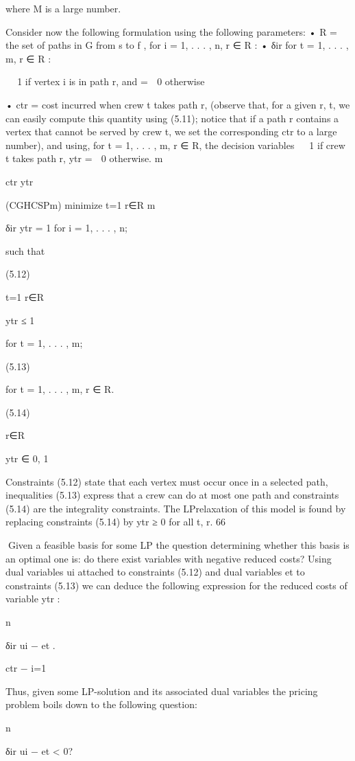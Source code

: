 \documentclass[titlepage]{book}
\theoremstyle{plain}
\theoremstyle{definition}
\theoremstyle{remark}
\begin{document}
where M is a large number.

Consider now the following formulation using the following parameters:
• R = the set of paths in G from s to f ,
for i = 1, . . . , n, r ∈ R :
• δir
for t = 1, . . . , m, r ∈ R :


 1 if vertex i is in path r, and
=
 0 otherwise

• ctr = cost incurred when crew t takes path r, (observe that, for a given r, t, we can easily compute
this quantity using (5.11); notice that if a path r contains a vertex that cannot be served by crew t, we
set the corresponding ctr to a large number),
and using, for t = 1, . . . , m, r ∈ R, the decision variables

 1 if crew t takes path r,
ytr =
 0 otherwise.
m

ctr ytr

(CGHCSPm) minimize
t=1 r∈R
m

δir ytr = 1 for i = 1, . . . , n;

such that

(5.12)

t=1 r∈R

ytr ≤ 1

for t = 1, . . . , m;

(5.13)

for t = 1, . . . , m, r ∈ R.

(5.14)

r∈R

ytr ∈ {0, 1}

Constraints (5.12) state that each vertex must occur once in a selected path, inequalities (5.13) express
that a crew can do at most one path and constraints (5.14) are the integrality constraints. The LPrelaxation of this model is found by replacing constraints (5.14) by ytr ≥ 0 for all t, r.
66

Given a feasible basis for some LP the question determining whether this basis is an optimal one is: do
there exist variables with negative reduced costs? Using dual variables ui attached to constraints (5.12)
and dual variables et to constraints (5.13) we can deduce the following expression for the reduced costs
of variable ytr :

n

δir ui − et .

ctr −
i=1

Thus, given some LP-solution and its associated dual variables the pricing problem boils down to the
following question:

n

δir ui − et < 0?
\end{document}
